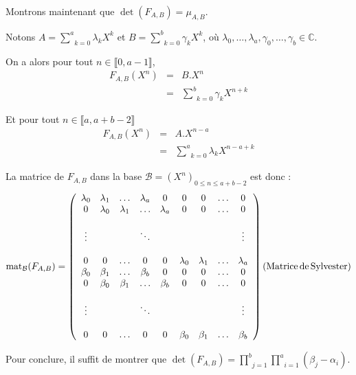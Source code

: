 Montrons maintenant que $\det (F_{A, B}) = \mu_{A, B}$.

Notons $A = \underset{k = 0}{\overset{a}{\sum}} \lambda_k X^k$ et $B =
\underset{k = 0}{\overset{b}{\sum}} \gamma_k X^k$, o{\`u} $\lambda_0, \ldots,
\lambda_a, \gamma_0, \ldots, \gamma_b \in \mathbb{C}$.

On a alors pour tout $n \in \llbracket 0, a - 1 \rrbracket$,
\begin{eqnarray*}
  F_{A, B} (X^n) & = & B.X^n\\
  & = & \underset{k = 0}{\overset{b}{\sum}} \gamma_k X^{n + k}
\end{eqnarray*}


Et pour tout $n \in \llbracket a, a + b - 2 \rrbracket$
\begin{eqnarray*}
  F_{A, B} (X^n) & = & A.X^{n - a}\\
  & = & \underset{k = 0}{\overset{a}{\sum}} \lambda_k X^{n - a + k}
\end{eqnarray*}


La matrice de $F_{A, B} $ dans la base $\mathcal{B}= (X^n)_{0 \leqslant n
\leqslant a + b - 2}$ est donc :
\[ \operatorname{mat}_{\mathcal{B}} (F_{A, B}) = \left( \begin{array}{ccccccccc}
     \lambda_0 & \lambda_1 & \ldots & \lambda_a & 0 & 0 & 0 & \ldots & 0\\
     0 & \lambda_0 & \lambda_1 & \ldots & \lambda_a & 0 & 0 & \ldots & 0\\
     &  &  &  &  &  &  &  & \\
     \vdots &  &  & \ddots &  &  &  &  & \vdots\\
     &  &  &  &  &  &  &  & \\
     0 & 0 & \ldots & 0 & 0 & \lambda_0 & \lambda_1 & \ldots & \lambda_a\\
     \beta_0 & \beta_1 & \ldots & \beta_b & 0 & 0 & 0 & \ldots & 0\\
     0 & \beta_0 & \beta_1 & \ldots & \beta_b & 0 & 0 & \ldots & 0\\
     &  &  &  &  &  &  &  & \\
     \vdots &  &  & \ddots &  &  &  &  & \vdots\\
     &  &  &  &  &  &  &  & \\
     0 & 0 & \ldots & 0 & 0 & \beta_0 & \beta_1 & \ldots & \beta_b
   \end{array} \right)  (\operatorname{Matrice} \operatorname{de} \operatorname{Sylvester}) \]


Pour conclure, il suffit de montrer que $\det (F_{A, B}) = \underset{j =
1}{\overset{b}{\prod}} \underset{i = 1}{\overset{a}{\prod}} (\beta_j -
\alpha_i)$.

